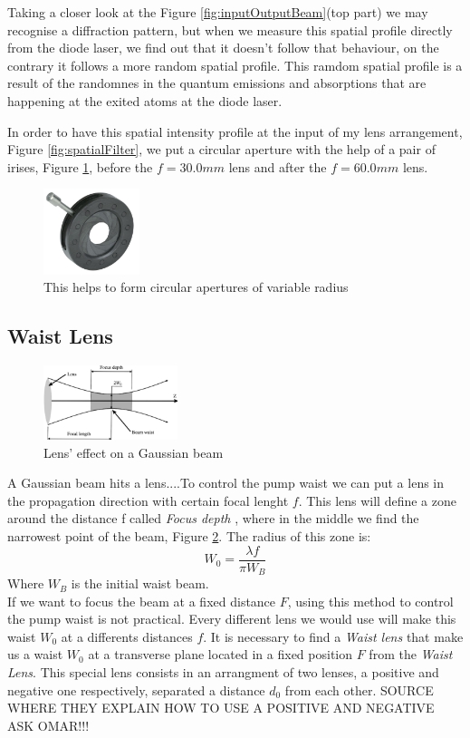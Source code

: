 Taking a closer look at the Figure  \ref{fig:inputOutputBeam}(top part) we may recognise a diffraction pattern, but when we measure this spatial profile directly from the diode laser, we find out that it doesn't follow that behaviour, on the contrary 
it follows a more random spatial profile. This ramdom spatial profile is a result of the randomnes in the
quantum emissions and absorptions that are happening at the exited atoms at the diode laser\cite{hecht}.

In order to have this spatial intensity profile at the input of my lens arrangement, Figure \ref{fig:spatialFilter},
we put a circular aperture with the help of a pair of irises, Figure \ref{fig:iris}, before the $f=30.0 mm$ lens and after the $f=60.0mm$ lens.
\begin{figure}[h!]
\centering
\includegraphics[width=0.25\textwidth]{Figures/iris.jpg}
\caption{This helps to form circular apertures of variable radius} 
\label{fig:iris}
\end{figure}


\subsection{Waist Lens}


\begin{figure}
\centering
\includegraphics[width=0.35\textwidth]{Figures/waist.png}
\caption{Lens' effect on a Gaussian beam} 
\label{fig:waist}
\end{figure}
A Gaussian beam hits a lens....To control the pump waist we can put a lens in the propagation direction with certain focal lenght $f$. This lens will define a zone around
the distance f called \textit{Focus depth}\cite{hecht} , where in the middle we find the narrowest point of the beam, Figure \ref{fig:waist}.
The radius of this zone is:
\begin{equation}
 W_0=\frac{\lambda f}{\pi W_B}
\end{equation}
Where $W_B$ is the initial waist beam. 
\\
If we want to focus the beam at a fixed distance $F$, using this method to control the pump waist is not practical. 
Every different lens we would use will make this waist $W_0$ at a differents distances $f$. It is necessary to find a \textit{Waist lens}
that make us a waist $W_0$ at a transverse plane located in a fixed position $F$ from the \textit{Waist Lens}. This
special lens consists in an arrangment of two lenses, a positive and negative one respectively, separated a distance 
$d_0$ from each other.
SOURCE WHERE THEY EXPLAIN HOW TO USE A POSITIVE AND NEGATIVE ASK OMAR!!!


